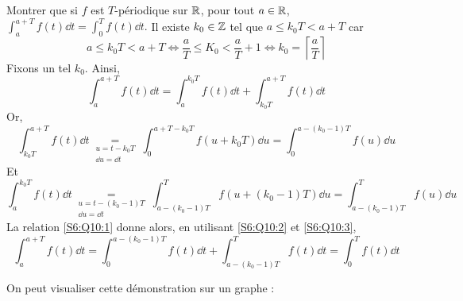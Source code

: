 \documentclass{article}
\renewenvironment{question_kholle}[2][ ]
{
	\subsection{\texorpdfstring{#2}{}}
	\notblank{#1}
	{
		\noindent #1
		\bigbreak
	}
	{}
	\begin{proof}
}
{
	\end{proof}
}
\begin{document}
\pagebreak

\begin{question_kholle}{Montrer que si $f$ est $T$-périodique sur $\mathbb R$, pour tout $a\in\mathbb R$, $\displaystyle\int_{a}^{a+T}f(t)\dd t = \int_{0}^{T}f(t)\dd t$.}
  Il existe $k_0\in\mathbb Z$ tel que $a\leq k_0 T<a+T$ car
  \begin{equation*}
    a\leq k_0T<a+T \iff \frac{a}{T} \leq K_0 < \frac{a}{T}+1 \iff k_0 = \left\lceil \frac{a}{T}\right\rceil
  \end{equation*}
  Fixons un tel $k_0$. Ainsi,
  \begin{equation}\label{S6:Q10:1}
    \int_{a}^{a+T}{f(t)\dd t} = \int_{a}^{k_0T}{f(t)\dd t} + \int_{k_0T}^{a+T}{f(t)\dd t}
  \end{equation}
  Or,
  \begin{equation}\label{S6:Q10:2}
    \int_{k_0T}^{a+T}{f(t)\dd t} \underset{\substack{u=t-k_0T \\ \dd u=\dd t}}{=} \int_{0}^{a+T-k_0T}{f(u+k_0T)\dd u} = \int_{0}^{a-(k_0-1)T}{f(u)\dd u}
  \end{equation}
  Et
  \begin{equation}\label{S6:Q10:3}
    \int_{a}^{k_0T}{f(t)}{\dd t} \underset{\substack{u=t-(k_0-1)T \\ \dd u=\dd t}}{=} \int_{a-(k_0-1)T}^{T}{f(u+(k_0-1)T)\dd u} = \int_{a-(k_0-1)T}^{T}{f(u)\dd u}
  \end{equation}
  La relation \eqref{S6:Q10:1} donne alors, en utilisant \eqref{S6:Q10:2} et \eqref{S6:Q10:3},
  \begin{equation}\label{S6:Q10:4}
    \int_{a}^{a+T}{f(t)\dd t} = \int_{0}^{a-(k_0-1)T}{f(t)\dd t}+\int_{a-(k_0-1)T}^{T}{f(t)\dd t} = \int_{0}^{T}{f(t)\dd t}
  \end{equation}

  On peut visualiser cette démonstration sur un graphe :

  \begin{figure}[H]
    \centering
\end{figure}
\end{question_kholle}
\end{document}
